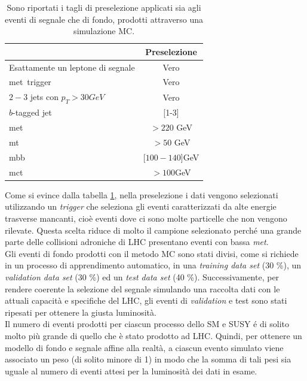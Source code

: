 \begin{table}[h!]
	\centering
	\begin{tabular}{lc}
		\hline
		&Preselezione \\
		\hline
		Esattamente un leptone di segnale&Vero\\
		met\ trigger&Vero\\
		$2-3$ jets con $p_{T}>30 GeV$&Vero\\
		$b$-tagged jet&[1-3]\\
		met\ &$> 220$ GeV\\
		mt\ &$> 50$ GeV\\
		mbb\ &[$100-140$]GeV\\
		mct\ &$>100$GeV\\
		\hline
	\end{tabular}
	\caption{Sono riportati i tagli di preselezione applicati sia agli eventi di segnale che di fondo, prodotti attraverso una simulazione MC.}
	\label{tab:tagli di preselezione}
\end{table}
Come si evince dalla tabella \ref{tab:tagli di preselezione}, nella preselezione i dati vengono selezionati utilizzando un \textit{trigger} che seleziona gli eventi caratterizzati da alte energie trasverse mancanti, cioè eventi  dove ci sono molte particelle che non vengono rilevate. Questa scelta riduce di molto il campione selezionato perché una grande parte delle collisioni adroniche di LHC presentano eventi con bassa \textit{met}. \\
Gli eventi di fondo prodotti con il metodo MC sono stati divisi, come si richiede in un processo di apprendimento automatico, in una \textit{training data set} (30 \%), un \textit{validation data set} (30 \%) ed un \textit{test data set} (40 \%). Successivamente, per rendere coerente la selezione del segnale simulando una raccolta dati con le attuali capacità e specifiche del LHC, gli eventi di \textit{validation} e test sono stati ripesati per ottenere la giusta luminosità.\\
Il numero di eventi prodotti per ciascun processo dello SM e SUSY é di solito molto più grande di quello che è stato prodotto ad LHC. Quindi, per ottenere un modello di fondo e segnale affine alla realtà, a ciascun evento simulato viene associato un peso (di solito minore di 1) in modo che la somma di tali pesi sia uguale al numero di eventi attesi per la luminosità dei dati in esame.




